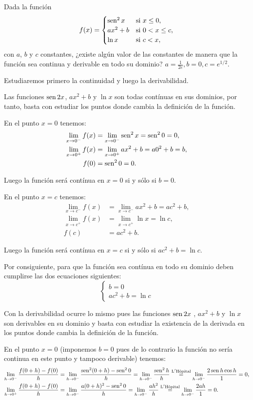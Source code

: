 {Dada la función
\[
f(x)=
\begin{cases}
\operatorname{sen}^2x & \mbox{si $x\leq 0$},  \\
ax^2+b &  \mbox{si $0<x\leq c$},  \\
\ln x &  \mbox{si $c<x$},
\end{cases}
\]
con $a$, $b$ y $c$ constantes, ¿existe algún valor de las constantes de manera que la función sea continua y derivable en todo su dominio?
}
{$a=\frac{1}{2e}, b=0, c=e^{1/2}.$
}
{Estudiaremos primero la continuidad y luego la derivabilidad.

Las funciones $\operatorname{sen} 2x$, $ax^2+b$ y $\ln x$ son todas contínuas en sus dominios, por tanto, basta con estudiar los puntos donde cambia la definici\'{o}n de la funci\'{o}n.

En el punto $x=0$ tenemos:
\begin{align*}
\lim_{x\rightarrow 0^{-}}f(x) &= \lim_{x\rightarrow 0^{-}}\operatorname{sen}^2x=\operatorname{sen}^20=0, \\
\lim_{x\rightarrow 0^{+}}f(x) &= \lim_{x\rightarrow 0^{+}}ax^2+b=a0^2+b=b, \\
f(0) &= \operatorname{sen}^20=0.
\end{align*}

Luego la función será contínua en $x=0$ si y sólo si $b=0$.

En el punto $x=c$ tenemos:
\begin{align*}
\lim_{x\rightarrow c^{-}}f(x) &= \lim_{x\rightarrow c^{-}}ax^2+b=ac^2+b, \\
\lim_{x\rightarrow c^{+}}f(x) &= \lim_{x\rightarrow c^{+}}\ln x=\ln c, \\
f(c) &= ac^2+b.
\end{align*}

Luego la función será contínua en $x=c$ si y sólo si $ac^2+b=\ln c$.

Por consiguiente, para que la función sea contínua en todo su dominio deben cumplirse las dos ecuaciones siguientes:
\[
\begin{cases}
b=0 \\
ac^2+b = \ln c
\end{cases}
\]

Con la derivabilidad ocurre lo mismo pues las funciones $\operatorname{sen} 2x$ , $ax^2+b$ y $\ln x$ son derivables en su dominio y basta con estudiar la existencia de la derivada en los puntos donde cambia la definición de la función.

En el punto $x=0$ (imponemos $b=0$ pues de lo contrario la función no sería continua en este punto y tampoco derivable) tenemos:
\begin{align*}
\lim_{h\rightarrow 0^{-}}\frac{f(0+h)-f(0)}{h} &= \lim_{h\rightarrow 0^{-}}\frac{\operatorname{sen}^2(0+h)-\operatorname{sen}^20}{h} = \lim_{h\rightarrow 0^{-}}\frac{\operatorname{sen}^2h}{h}\stackrel{\text{L}^{\prime }\text{H\^{o}pital}}{=}\lim_{h\rightarrow 0^{-}}\frac{2\operatorname{sen} h\cos h}{1}=0, \\
\lim_{h\rightarrow 0^{+}}\frac{f(0+h)-f(0)}{h} &= \lim_{h\rightarrow 0^{-}}\frac{a(0+h)^2-\operatorname{sen}^20}{h}=\lim_{h\rightarrow 0^{-}}\frac{ah^2}h\stackrel{\text{L}^{\prime }\text{H\^{o}pital}}{=}\lim_{h\rightarrow 0^{-}}\frac{2ah}{1}=0.
\end{align*}

}
